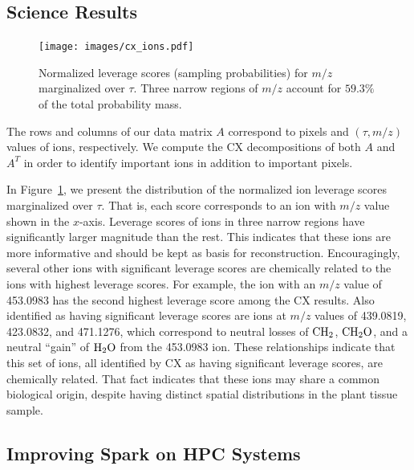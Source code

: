   \subsection{Science Results}
  
  \begin{figure}[h!bt]
    \centering
    \texttt{[image: images/cx\_ions.pdf]}
      \caption{Normalized leverage scores (sampling probabilities) for $m/z$ marginalized over $\tau$.
        Three narrow regions of $m/z$ account for $59.3\%$ of the total probability mass.}
      \label{fig:cx_ions}
  \end{figure} 

  The rows and columns of our data matrix $A$ correspond to pixels and $(\tau, m/z)$ values of ions, respectively. 
  We compute the CX decompositions of both $A$ and $A^T$ in order to identify important ions in addition to important pixels.
   
  In Figure~\ref{fig:cx_ions}, we present the distribution of the normalized
  ion leverage scores marginalized over $\tau$. That is, each score corresponds
  to an ion with $m/z$ value shown in the $x$-axis. Leverage scores of ions in
  three narrow regions have significantly larger magnitude than the rest. This
  indicates that these ions are more informative and should be kept as basis
  for reconstruction.  Encouragingly, several other ions with significant
  leverage scores are chemically related to the ions with highest leverage
  scores.  For example, the ion with an $m/z$ value of 453.0983 has the second
  highest leverage score among the CX results.  Also identified as having
  significant leverage scores are ions at $m/z$ values of 439.0819, 423.0832,
  and 471.1276, which correspond to neutral losses of $\rm{CH_2}$,
  $\rm{CH_2O}$, and a neutral ``gain'' of $\rm{H_2O}$ from the 453.0983 ion.
  These relationships indicate that this set of ions, all identified by CX as
  having significant leverage scores, are chemically related.  That fact
  indicates that these ions may share a common biological origin, despite
  having distinct spatial distributions in the plant tissue sample.
  

  \subsection{Improving Spark on HPC Systems}
  \label{sect:lessons}
  
  

